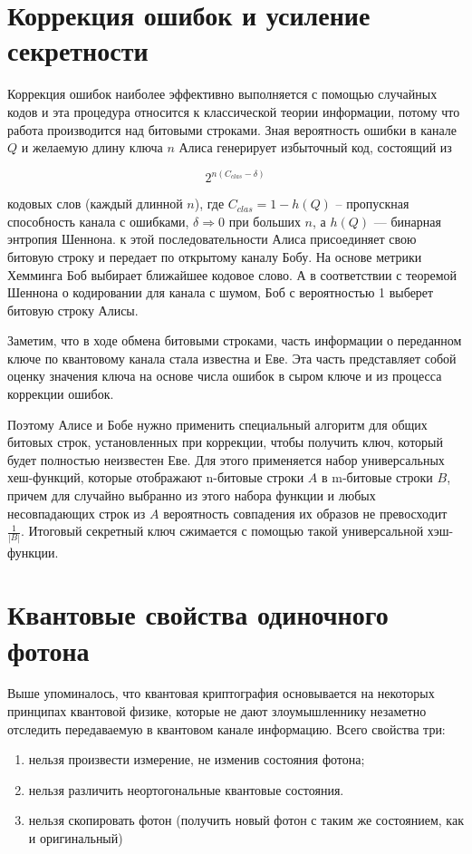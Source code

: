 \documentclass[a4paper,14pt]{extarticle}
\begin{document}
\section{Коррекция ошибок и усиление секретности}

Коррекция ошибок наиболее эффективно выполняется с помощью случайных кодов и
эта процедура относится к классической теории информации, потому что работа
производится над битовыми строками. Зная вероятность ошибки в канале $Q$ и желаемую
длину ключа $n$ Алиса генерирует избыточный код, состоящий из 

$$ 2^{n(C_{clas} - \delta)} $$

кодовых слов (каждый длинной $n$), где $C_{clas} = 1 - h(Q)$ -- пропускная
способность канала с ошибками, $\delta \Rightarrow 0$ при больших $n$, а $h(Q)$
--- бинарная энтропия Шеннона. к этой последовательности Алиса присоединяет
свою битовую строку и передает по открытому каналу Бобу. На основе метрики
Хемминга Боб выбирает ближайшее кодовое слово. А в соответствии с теоремой
Шеннона о кодировании для канала с шумом, Боб с вероятностью 1 выберет битовую
строку Алисы.

Заметим, что в ходе обмена битовыми строками, часть информации о переданном
ключе по квантовому канала стала известна и Еве. Эта часть представляет собой
оценку значения ключа на основе числа ошибок в сыром ключе и из процесса
коррекции ошибок.

Поэтому Алисе и Бобе нужно применить специальный алгоритм для общих битовых
строк, установленных при коррекции, чтобы получить ключ, который будет
полностью неизвестен Еве. Для этого применяется набор универсальных
хеш-функций, которые отображают n-битовые строки $A$ в m-битовые строки $B$,
причем для случайно выбранно из этого набора функции и любых несовпадающих
строк из $A$ вероятность совпадения их образов не превосходит $\frac{1}{|B|}$.
Итоговый секретный ключ сжимается с помощью такой универсальной хэш-функции.

\section{Квантовые свойства одиночного фотона}

Выше упоминалось, что квантовая криптография основывается на некоторых
принципах квантовой физике, которые не дают злоумышленнику незаметно отследить
передаваемую в квантовом канале информацию. Всего свойства три:
\begin{enumerate}
    \item нельзя произвести измерение, не изменив состояния фотона;
    \item нельзя различить неортогональные квантовые состояния.
    \item нельзя скопировать фотон (получить новый фотон с таким же состоянием,
        как и оригинальный)
\end{enumerate}
\end{document}
